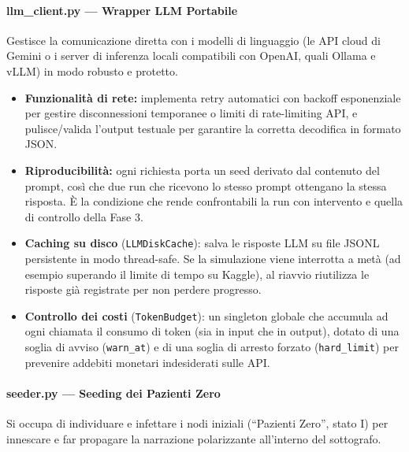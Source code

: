 \documentclass[11pt, a4paper]{article}
\begin{document}
\paragraph{llm\_client.py — Wrapper LLM Portabile}
Gestisce la comunicazione diretta con i modelli di linguaggio (le API cloud di Gemini o i server di inferenza locali compatibili con OpenAI, quali Ollama e vLLM) in modo robusto e protetto.

\begin{itemize}[leftmargin=*]
    \item \textbf{Funzionalità di rete:} implementa retry automatici con backoff esponenziale per gestire disconnessioni temporanee o limiti di rate-limiting API, e pulisce/valida l'output testuale per garantire la corretta decodifica in formato JSON.
    \item \textbf{Riproducibilità:} ogni richiesta porta un seed derivato dal contenuto del prompt, così che due run che ricevono lo stesso prompt ottengano la stessa risposta. È la condizione che rende confrontabili la run con intervento e quella di controllo della Fase 3.
    \item \textbf{Caching su disco} (\texttt{LLMDiskCache}): salva le risposte LLM su file JSONL persistente in modo thread-safe. Se la simulazione viene interrotta a metà (ad esempio superando il limite di tempo su Kaggle), al riavvio riutilizza le risposte già registrate per non perdere progresso.
    \item \textbf{Controllo dei costi} (\texttt{TokenBudget}): un singleton globale che accumula ad ogni chiamata il consumo di token (sia in input che in output), dotato di una soglia di avviso (\texttt{warn\_at}) e di una soglia di arresto forzato (\texttt{hard\_limit}) per prevenire addebiti monetari indesiderati sulle API.
\end{itemize}

\paragraph{seeder.py — Seeding dei Pazienti Zero}
Si occupa di individuare e infettare i nodi iniziali (``Pazienti Zero'', stato I) per innescare e far propagare la narrazione polarizzante all'interno del sottografo.
\end{document}
